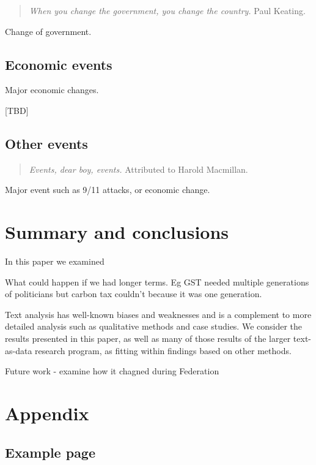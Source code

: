 \documentclass[12pt,]{article}
\theoremstyle{definition}
\theoremstyle{definition}
\theoremstyle{definition}
\theoremstyle{remark}
\begin{document}
\begin{quote}
\emph{When you change the government, you change the country.} Paul
Keating.
\end{quote}

Change of government.

\subsection{Economic events}\label{economic-events}

Major economic changes.

{[}TBD{]}

\subsection{Other events}\label{other-events}

\begin{quote}
\emph{Events, dear boy, events.} Attributed to Harold Macmillan.
\end{quote}

Major event such as 9/11 attacks, or economic change.

\section{Summary and conclusions}\label{summary-and-conclusions}

In this paper we examined

What could happen if we had longer terms. Eg GST needed multiple
generations of politicians but carbon tax couldn't because it was one
generation.

Text analysis has well-known biases and weaknesses and is a complement
to more detailed analysis such as qualitative methods and case studies.
We consider the results presented in this paper, as well as many of
those results of the larger text-as-data research program, as fitting
within findings based on other methods.

Future work - examine how it chagned during Federation

\newpage

\section{Appendix}\label{appendix}

\subsection{Example page}\label{example-page}
\end{document}
